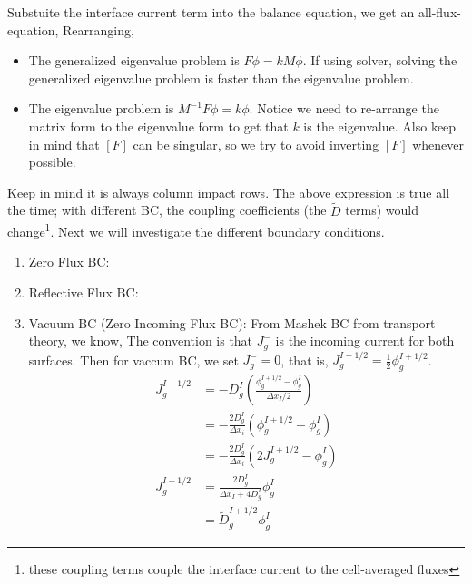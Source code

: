 \documentclass{school-22.211-notes}
\begin{document}
\clearpage
{}
Substuite the interface current term into the balance equation, we get an all-flux-equation,
Rearranging,
\begin{itemize}
\item The generalized eigenvalue problem is $F\phi = k M \phi$. If using solver, solving the generalized eigenvalue problem is faster than the eigenvalue problem. 
\item The eigenvalue problem is $M^{-1} F \phi = k \phi$. Notice we need to re-arrange the matrix form to the eigenvalue form to get that $k$ is the eigenvalue. Also keep in mind that $[F]$ can be singular, so we try to avoid inverting $[F]$ whenever possible. 
\end{itemize}
Keep in mind it is always column impact rows. 
The above expression is true all the time; with different BC, the coupling coefficients (the $\tilde{D}$ terms) would change\footnote{these coupling terms couple the interface current to the cell-averaged fluxes}. Next we will investigate the different boundary conditions. 
\begin{enumerate}
\item Zero Flux BC: 
\item Reflective Flux BC:
\item Vacuum BC (Zero Incoming Flux BC): 
  From Mashek BC from transport theory, we know,
  The convention is that $J_g^-$ is the incoming current for both surfaces. Then for vaccum BC, we set $J_g^- = 0$, that is, $J_g^{I+1/2} = \frac{1}{2} \phi_g^{I+1/2}$. 
  \begin{align}
    J_g^{I+1/2} &= - D_g^I \left( \frac{\phi_g^{I+1/2} - \phi_g^I}{\Delta x_I/2} \right) \\
    &= - \frac{2D_g^I}{\Delta x_i} (\phi_g^{I+1/2} - \phi_g^I) \\
    &= - \frac{2D_g^I}{\Delta x_i} (2J_g^{I+1/2} - \phi_g^I) \\
    J_g^{I+1/2}&= \frac{2D_g^I}{\Delta x_I + 4D_g^I} \phi_g^I \\
    &= \tilde{D}_g^{I+1/2} \phi_g^I 
  \end{align}
\end{enumerate}
\end{document}

